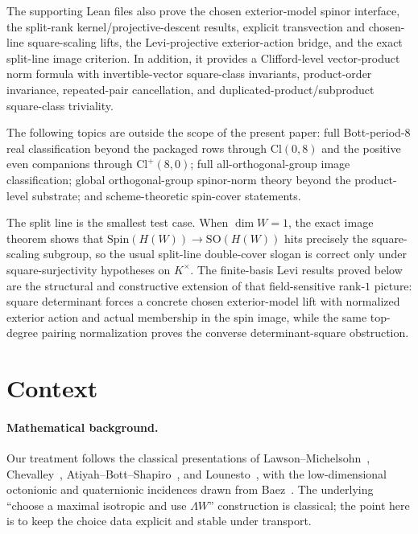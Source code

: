 \documentclass{birkjour}
\theoremstyle{plain}
\theoremstyle{definition}
\theoremstyle{remark}
\newcommand{\Cl}{\mathrm{Cl}}
\newcommand{\Spin}{\mathrm{Spin}}
\newcommand{\SO}{\mathrm{SO}}
\newcommand{\wedgeW}{\Lambda W}
\begin{document}
The supporting Lean files also prove the chosen exterior-model spinor interface, the split-rank
kernel/projective-descent results, explicit transvection and chosen-line
square-scaling lifts, the Levi-projective exterior-action bridge, and the exact
split-line image criterion. In addition, it provides a Clifford-level
vector-product norm formula with invertible-vector square-class invariants,
product-order invariance, repeated-pair cancellation, and
duplicated-product/subproduct square-class triviality.

The following topics are outside the scope of the present paper:
full Bott-period-$8$ real classification beyond the packaged rows through
$\Cl(0,8)$ and the positive even companions through $\Cl^+(8,0)$; full
all-orthogonal-group image classification; global orthogonal-group spinor-norm
theory beyond the product-level substrate; and scheme-theoretic spin-cover
statements.

The split line is the smallest test case. When $\dim W=1$, the exact image
theorem shows that $\Spin(H(W)) \to \SO(H(W))$ hits precisely the
square-scaling subgroup, so the usual split-line double-cover slogan is correct
only under square-surjectivity hypotheses on $K^\times$. The finite-basis Levi
results proved below are the structural and constructive extension of that
field-sensitive rank-$1$ picture: square determinant forces a concrete
chosen exterior-model lift with normalized exterior action and actual membership in the
spin image, while the same top-degree pairing normalization proves the converse
determinant-square obstruction.

\section{Context}
\label{sec:related}

\paragraph{Mathematical background.} Our treatment follows the classical
presentations of Lawson--Michelsohn~{}\cite{LawsonMichelsohn1989},
Chevalley~{}\cite{Chevalley1996}, Atiyah--Bott--Shapiro~{}\cite{AtiyahBottShapiro1964},
and Lounesto~{}\cite{Lounesto2001}, with the low-dimensional octonionic and
quaternionic incidences drawn from Baez~{}\cite{Baez2002}. The underlying
``choose a maximal isotropic and use $\wedgeW$'' construction is classical;
the point here is to keep the choice data explicit and stable under transport.
\end{document}
